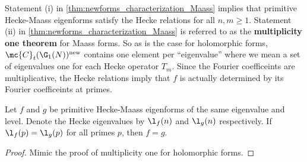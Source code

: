     Statement (i) in \cref{thm:newforms_characterization_Maass} implies that primitive Hecke-Maass eigenforms satisfy the Hecke relations for all $n,m \ge 1$. Statement (ii) in \cref{thm:newforms_characterization_Maass} is referred to as the \textbf{multiplicity one theorem} for Maass forms. So as is the case for holomorphic forms, $\mc{C}_{t}(\G_{1}(N))^{\mathrm{new}}$ contains one element per ``eigenvalue'' where we mean a set of eigenvalues one for each Hecke operator $T_{m}$. Since the Fourier coefficeints are multiplicative, the Hecke relations imply that $f$ is actually determined by its Fourier coefficeints at primes. 
    
    \begin{theorem}
      Let $f$ and $g$ be primitive Hecke-Maass eigenforms of the same eigenvalue and level. Denote the Hecke eigenvalues by $\l_{f}(n)$ and $\l_{g}(n)$ respectively. If $\l_{f}(p) = \l_{g}(p)$ for all primes $p$, then $f = g$.
    \end{theorem}
    \begin{proof}
      Mimic the proof of multiplicity one for holomorphic forms.
    \end{proof}

